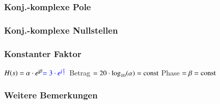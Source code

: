 \begin{minipage}[t]{0.48\columnwidth}
    \raggedright
    \subsubsection{Konj.-komplexe Pole} %

    

\end{minipage}
\hfill
\begin{minipage}[t]{0.48\columnwidth}
    \raggedright
    \subsubsection{Konj.-komplexe Nullstellen} %

    

\end{minipage}



\begin{minipage}[t]{0.48\columnwidth}
    \raggedright
    \subsubsection{Konstanter Faktor}

    \begin{outline}
        \1 $H(s) = \alpha \cdot e^{\mathrm{j} \beta} {\color{blue}= 3 \cdot e^{\mathrm{j} \frac{\pi}{2}}}$
            \2 Betrag $= 20 \cdot \log_{10}(\alpha) = \mathrm{const}$
            \2 Phase $= \beta = \mathrm{const}$
    \end{outline}
    
    
\end{minipage}
\hfill
\begin{minipage}[t]{0.48\columnwidth}
    \raggedright
    \subsubsection{Weitere Bemerkungen}


\end{minipage}





